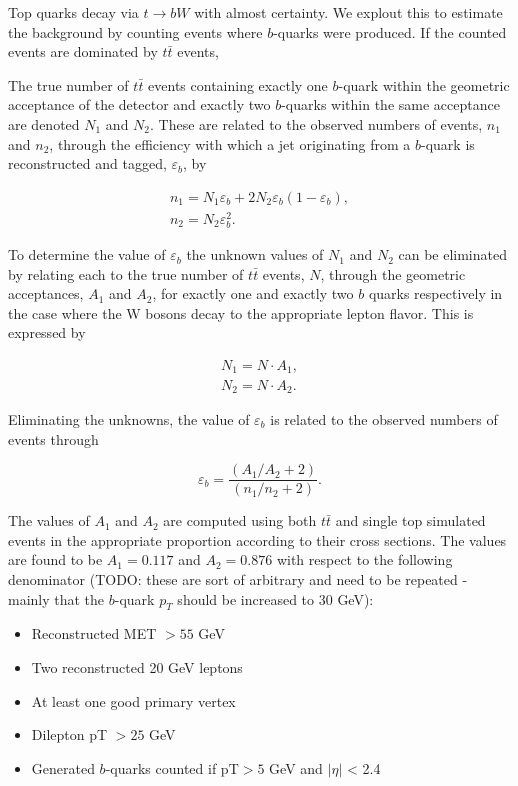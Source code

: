 Top quarks decay via $t\rightarrow bW$ with almost certainty.  
We explout this to estimate the background by counting events where $b$-quarks were produced. 
If the counted events are dominated by $t\bar{t}$ events, 

The true number of $t\bar{t}$ events containing exactly one $b$-quark within the geometric acceptance 
of the detector and exactly two $b$-quarks within the same acceptance are denoted $N_{1}$ and $N_{2}$.  
These are related to the observed numbers of events, $n_{1}$ and $n_{2}$, 
through the efficiency with which a jet originating from a $b$-quark 
is reconstructed and tagged, $\varepsilon_{b}$, by 

\begin{eqnarray}
n_{1} = N_{1}\varepsilon_{b} + 2N_{2}\varepsilon_{b}(1-\varepsilon_{b}) \label{eqn:analysis_bTagEff1_n1},\\
n_{2} = N_{2}\varepsilon_{b}^{2} \label{eqn:analysis_bTagEff1_n2}.
\end{eqnarray}

To determine the value of $\varepsilon_{b}$ the unknown values of $N_{1}$ and $N_{2}$ 
can be eliminated by relating each to the true number of $t\bar{t}$ events, $N$, 
through the geometric acceptances, $A_1$ and $A_2$, for exactly one and exactly two $b$ quarks 
respectively in the case where the W bosons decay to the appropriate lepton flavor. 
This is expressed by

\begin{eqnarray}
N_{1} = N\cdot A_{1}, \\
N_{2} = N\cdot A_{2}.
\end{eqnarray}

Eliminating the unknowns, the value of $\varepsilon_{b}$ is related to the observed numbers of events through 

\begin{equation}
\label{eqn:analysis_bTagEff}
\varepsilon_{b} = \frac{(A_{1}/A_{2} + 2)}{(n_{1}/n_{2}+ 2)}.
\end{equation}

The values of $A_1$ and $A_2$ are computed using both $t\bar{t}$ and single top simulated events
in the appropriate proportion according to their cross sections. The values are found to be
$A_1=0.117$ and $A_2=0.876$ with respect to the following denominator 
(TODO: these are sort of arbitrary and need to be repeated - mainly that the $b$-quark 
$p_{T}$ should be increased to 30 GeV):

\begin{itemize}
    \item Reconstructed MET $> 55$ GeV
    \item Two reconstructed 20 GeV leptons
    \item At least one good primary vertex
    \item Dilepton pT $> 25$ GeV
    \item Generated $b$-quarks counted if pT$>5$ GeV and $|\eta|$ < 2.4
\end{itemize}

